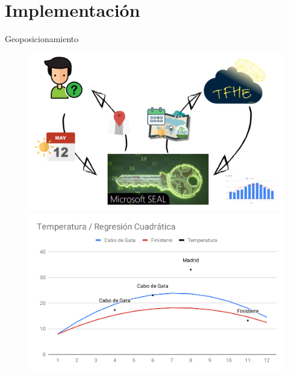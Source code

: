 \documentclass{beamer}
\begin{document}
\section{Implementación}

\begin{frame}{Geoposicionamiento}

    \begin{figure}[H]
        \begin{overprint}
            \centering\includegraphics[width=\textwidth]{sistema_completo}
            \centering\includegraphics[width=\textwidth]{t_vs_r2}
        \end{overprint}
    \end{figure}

\end{frame}
\end{document}

